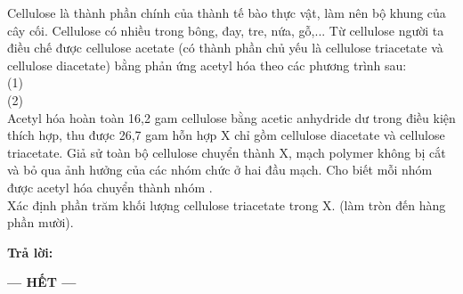 \documentclass[11pt,a4paper]{article}
\begin{document}
\begin{ex}
Cellulose là thành phần chính của thành tế bào thực vật, làm nên bộ khung của cây cối. Cellulose có nhiều trong bông, đay, tre, nứa, gỗ,... Từ cellulose người ta điều chế được cellulose acetate (có thành phần chủ yếu là cellulose triacetate và cellulose diacetate) bằng phản ứng acetyl hóa theo các phương trình sau:\\
(1) \\
(2) \\
Acetyl hóa hoàn toàn 16,2 gam cellulose bằng acetic anhydride  dư trong điều kiện thích hợp, thu được 26,7 gam hỗn hợp X chỉ gồm cellulose diacetate và cellulose triacetate. Giả sử toàn bộ cellulose chuyển thành X, mạch polymer không bị cắt và bỏ qua ảnh hưởng của các nhóm chức ở hai đầu mạch. Cho biết mỗi nhóm  được acetyl hóa chuyển thành nhóm .\\
Xác định phần trăm khối lượng cellulose triacetate trong X. (làm tròn đến hàng phần mười).
\par\textbf{Trả lời:} \dotfill
\end{ex}

\begin{center}
\textbf{--- HẾT ---}
\end{center}
\end{document}
